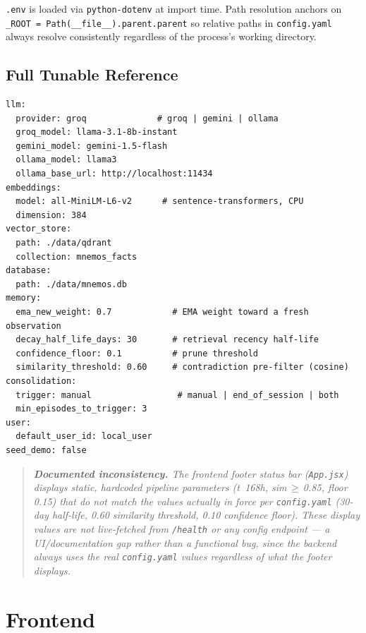 \documentclass[11pt,a4paper]{report}
\newcommand{\code}[1]{\texttt{\small #1}}
\newcommand{\file}[1]{\texttt{\small\color{accent!70!black}#1}}
\begin{document}
\code{.env} is loaded via \code{python-dotenv} at import time. Path resolution anchors on \code{\_ROOT = Path(\_\_file\_\_).parent.parent} so relative paths in \file{config.yaml} always resolve consistently regardless of the process's working directory.

\section{Full Tunable Reference}

\begin{lstlisting}[caption={config.yaml}]
llm:
  provider: groq              # groq | gemini | ollama
  groq_model: llama-3.1-8b-instant
  gemini_model: gemini-1.5-flash
  ollama_model: llama3
  ollama_base_url: http://localhost:11434
embeddings:
  model: all-MiniLM-L6-v2      # sentence-transformers, CPU
  dimension: 384
vector_store:
  path: ./data/qdrant
  collection: mnemos_facts
database:
  path: ./data/mnemos.db
memory:
  ema_new_weight: 0.7            # EMA weight toward a fresh observation
  decay_half_life_days: 30       # retrieval recency half-life
  confidence_floor: 0.1          # prune threshold
  similarity_threshold: 0.60     # contradiction pre-filter (cosine)
consolidation:
  trigger: manual                 # manual | end_of_session | both
  min_episodes_to_trigger: 3
user:
  default_user_id: local_user
seed_demo: false
\end{lstlisting}

\begin{quote}\small\itshape
\textbf{Documented inconsistency.} The frontend footer status bar (\file{App.jsx}) displays static, hardcoded pipeline parameters (\emph{t\textonehalf\ 168h}, \emph{sim\,$\geq$\,0.85}, \emph{floor 0.15}) that do not match the values actually in force per \file{config.yaml} (30-day half-life, 0.60 similarity threshold, 0.10 confidence floor). These display values are not live-fetched from \code{/health} or any config endpoint — a UI/documentation gap rather than a functional bug, since the backend always uses the real \file{config.yaml} values regardless of what the footer displays.
\end{quote}

\chapter{Frontend}
\end{document}
